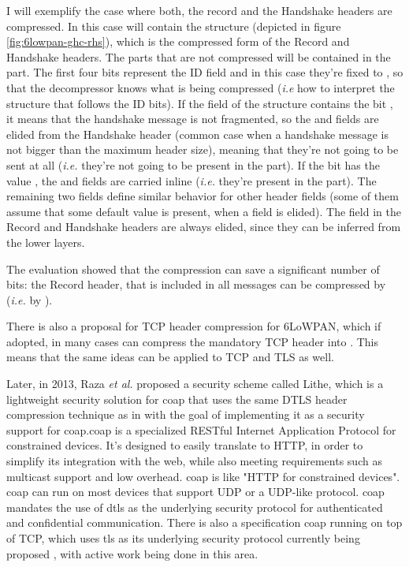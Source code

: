 \documentclass{llncs}
\begin{document}
I will exemplify the case where both, the record and the Handshake headers are compressed.
In this case  will contain the 
structure (depicted in figure \ref{fig:6lowpan-ghc-rhs}), which is the compressed form of the Record and Handshake headers. The
parts that are not compressed will be contained in the  part.
The first four bits represent the ID field and in this case they're fixed to ,
so that the decompressor knows what is being compressed (\textit{i.e} how to interpret
the structure that follows the ID bits). If the  field of the  structure contains the
bit , it means that the handshake message is not fragmented, so
the  and  fields are
elided from the Handshake header (common case when a handshake message is not bigger than
the maximum header size), meaning that they're not going to be sent at
all (\textit{i.e.} they're not going to be present in the  part).
If the  bit has the value , the 
and  fields are carried inline (\textit{i.e.} they're
present in the  part). The remaining two fields define similar
behavior for other header fields (some of them assume that some default value is present, when a field is elided).
The  field in the Record and Handshake headers are always elided,
since they can be inferred from the lower layers.

The evaluation showed that the compression can save a significant number of bits:
the Record header, that is included in all messages can be compressed by 
(\textit{i.e.} by ).

There is also a proposal for TCP header compression for 6LoWPAN\cite{I-D.aayadi-6lowpan-tcphc},
which if adopted, in many cases can compress the mandatory  TCP header
into . This means that the same ideas can be applied to TCP and
TLS as well.

Later, in 2013, Raza \textit{et al.} proposed a security scheme called Lithe\cite{LitheLig40:online},
which is a lightweight security solution for \gls{coap} that uses the same DTLS header
compression technique as in \cite{6LoWPANC53:online} with the goal of implementing
it as a security support for \gls{coap}.\gls{coap}\cite{RFC7959} is a specialized
RESTful Internet Application Protocol for constrained devices. It's designed to easily
translate to HTTP, in order to simplify its integration with the web,
while also meeting requirements such as multicast support and low overhead.
\gls{coap} is like "HTTP for constrained devices".
\gls{coap} can run on most devices that support UDP or a UDP-like protocol.
\gls{coap} mandates the use of \gls{dtls} as the underlying security protocol for
authenticated and confidential communication. There is also a specification \gls{coap}
running on top of TCP, which uses \gls{tls} as its underlying security protocol
currently being proposed \cite{I.D.draft-ietf-core-coap-tcp-tls},
with active work being done in this area.
\end{document}
